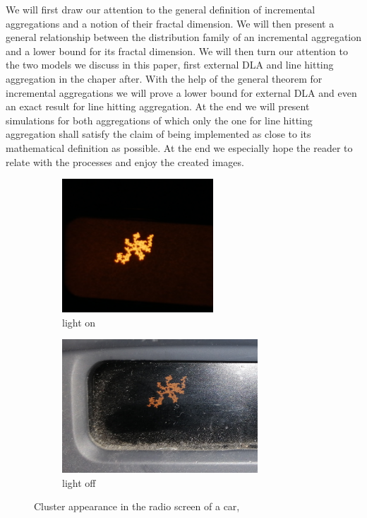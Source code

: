 \documentclass[12pt,a4paper]{scrartcl}
\newcommand{\1}{\mathbbm{1}}
\theoremstyle{definition}
\numberwithin{equation}{section}
\begin{document}
	\noindent We will first draw our attention to the general definition of incremental aggregations and a notion of their fractal dimension. We will then present a general relationship between the distribution family of an incremental aggregation and a lower bound for its fractal dimension. We will then turn our attention to the two models we discuss in this paper, first external DLA and line hitting aggregation in the chaper after. With the help of the general theorem for incremental aggregations we will prove a lower bound for external DLA and even an exact result for line hitting aggregation. At the end we will present simulations for both aggregations of which only the one for line hitting aggregation shall satisfy the claim of being implemented as close to its mathematical definition as possible. At the end we especially hope the reader to relate with the processes and enjoy the created images.\\
	
\begin{figure}[h!]
	\centering
	\begin{subfigure}[b]{.47\textwidth}
		\centerline{\includegraphics[height=5cm]{images/display.jpg}}
		\caption{light on} 
	\end{subfigure}
	\begin{subfigure}[b]{.47\textwidth}
		\centerline{\includegraphics[height=5cm]{images/display2.jpg}}
		\caption{light off} 
	\end{subfigure}
	\caption{Cluster appearance in the radio screen of a car, \cite{own}}
	\label{radio}
\end{figure}
\end{document}
